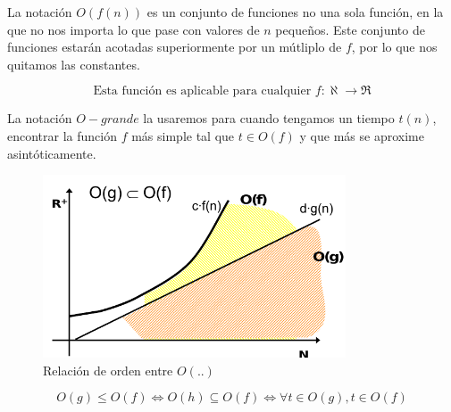 \documentclass[10pt,a4paper,spanish]{report}
\theoremstyle{definition}
\theoremstyle{remark}
\begin{document}
    La notación $O(f(n))$ es un conjunto de funciones no una sola función, en la que no nos importa lo que pase con valores de $n$ pequeños. Este conjunto de funciones estarán acotadas superiormente por un mútliplo de $f$, por lo que nos quitamos las constantes.

    \begin{displaymath}
        \text{Esta función es aplicable para cualquier } f:\aleph \rightarrow \Re
    \end{displaymath}

    La notación $O-grande$ la usaremos para cuando tengamos un tiempo $t(n)$, encontrar la función $f$ más simple tal que $t \in O(f)$ y que más se aproxime asintóticamente.


    \begin{figure}[!h]
    \centering
    \includegraphics[width=0.8\textwidth]{3}
    \caption{Relación de orden entre $O(..)$}
    \label{Ogrande}
    \end{figure}
    \begin{displaymath}
        O(g) \leq O(f) \Leftrightarrow O(h) \subseteq O(f) \Leftrightarrow \forall t \in O(g), t \in O(f)
    \end{displaymath}
\end{document}
